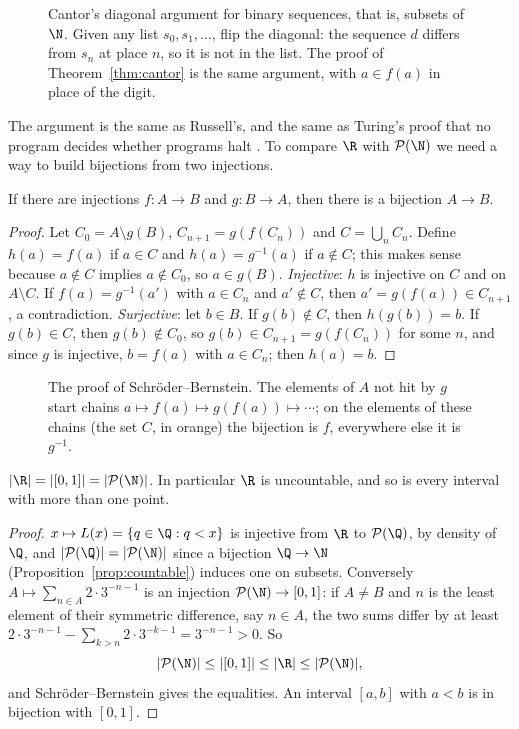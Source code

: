 \begin{figure}[ht]
\centering
{}
\caption{Cantor's diagonal argument for binary sequences, that is, subsets of $\N$. Given any list $s_0,s_1,\ldots$, flip the diagonal: the
sequence $d$ differs from $s_n$ at place $n$, so it is not in the list. The proof of Theorem~\ref{thm:cantor} is the same argument, with
$a\in f(a)$ in place of the digit.}
\label{fig:diagonal}
\end{figure}

The argument is the same as Russell's, and the same as Turing's proof that no program decides whether programs halt
. To compare $\R$ with $\mathcal P(\N)$ we need a way to build bijections from two injections.

\begin{theorem}\label{thm:sb}
If there are injections $f:A\to B$ and $g:B\to A$, then there is a bijection $A\to B$.
\end{theorem}
\begin{proof}
Let $C_0=A\setminus g(B)$, $C_{n+1}=g(f(C_n))$ and $C=\bigcup_nC_n$. Define $h(a)=f(a)$ if $a\in C$ and $h(a)=g^{-1}(a)$ if $a\notin C$; this makes sense
because $a\notin C$ implies $a\notin C_0$, so $a\in g(B)$. \emph{Injective}: $h$ is injective on $C$ and on $A\setminus C$. If $f(a)=g^{-1}(a')$ with $a\in C_n$ and
$a'\notin C$, then $a'=g(f(a))\in C_{n+1}$, a contradiction. \emph{Surjective}: let $b\in B$. If $g(b)\notin C$, then $h(g(b))=b$. If $g(b)\in C$, then
$g(b)\notin C_0$, so $g(b)\in C_{n+1}=g(f(C_n))$ for some $n$, and since $g$ is injective, $b=f(a)$ with $a\in C_n$; then $h(a)=b$.
\end{proof}

\begin{figure}[ht]
\centering
{}
\caption{The proof of Schr\"oder--Bernstein. The elements of $A$ not hit by $g$ start chains $a\mapsto f(a)\mapsto g(f(a))\mapsto\cdots$; on the elements of these
chains (the set $C$, in orange) the bijection is $f$, everywhere else it is $g^{-1}$.}
\label{fig:sb}
\end{figure}

\begin{theorem}\label{thm:continuum}
$|\R|=|[0,1]|=|\mathcal P(\N)|$. In particular $\R$ is uncountable, and so is every interval with more than one point.
\end{theorem}
\begin{proof}
$x\mapsto L(x)=\{q\in\Q:q<x\}$ is injective from $\R$ to $\mathcal P(\Q)$, by density of $\Q$, and $|\mathcal P(\Q)|=|\mathcal P(\N)|$ since a bijection $\Q\to\N$
(Proposition~\ref{prop:countable}) induces one on subsets. Conversely $A\mapsto\sum_{n\in A}2\cdot3^{-n-1}$ is an injection $\mathcal P(\N)\to[0,1]$: if $A\ne B$ and $n$ is the
least element of their symmetric difference, say $n\in A$, the two sums differ by at least $2\cdot3^{-n-1}-\sum_{k>n}2\cdot3^{-k-1}=3^{-n-1}>0$. So
\[|\mathcal P(\N)|\le|[0,1]|\le|\R|\le|\mathcal P(\N)|,\]
and Schr\"oder--Bernstein gives the equalities. An interval $[a,b]$ with $a<b$ is in bijection with $[0,1]$.
\end{proof}

